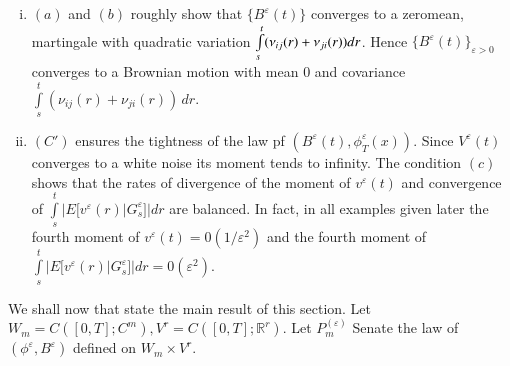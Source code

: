 \begin{remarks}\label{c3:rem3.2.1}%
  \begin{enumerate}[(i)]
  \item  $(a)$ and $(b)$ roughly show that $\{B^\varepsilon (t)\}$
    converges to a zeromean, martingale with quadratic variation
    $\int\limits_{s}^t(\nu_{ij}(r) + \nu_{ji} (r))\break dr$. Hence $\{ B^\varepsilon
    (t)\}_{\varepsilon > 0}$ converges to a Brownian motion with mean
    $0$ and covariance $\int\limits_{s}^t(\nu_{ij}(r) + \nu_{ji} (r))
    \, dr$.   

  \item $(C')$ ensures the tightness of the law pf $(B^\varepsilon(t),
    \phi^\varepsilon_T(x))$. Since  $V^\varepsilon(t)$ converges to a
    white noise its moment tends to infinity. The condition $(c)$ shows
    that the rates of divergence of the moment of $v^\varepsilon (t)$
    and convergence of $\int\limits^t_s |E[v^\varepsilon (r)
      |G^\varepsilon_s] | dr$ are balanced. In fact, in all examples
    given later the fourth moment of $v^\varepsilon (t)=
    0(1/\varepsilon^2)$ and the fourth moment of $\int\limits^t_s
    |E[v^\varepsilon (r) | G^\varepsilon_s] |dr=0(\varepsilon^2)$. 
  \end{enumerate}  
\end{remarks}

We shall now that state the main result of this section. Let $W_m=
C([0,T];  C^m), V^r= C([0,T]; \mathbb{R}^r)$. Let $P^{(\varepsilon)}_m$
Senate the law of $(\phi^\varepsilon, B^\varepsilon)$ defined on $W_m
\times  V^r$. 

